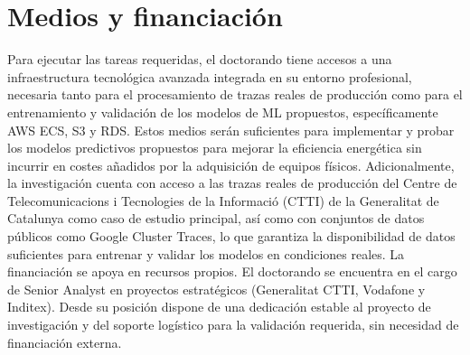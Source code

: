 \section{Medios y financiación}
Para ejecutar las tareas requeridas, el doctorando tiene accesos a una infraestructura tecnológica avanzada integrada en su entorno profesional, necesaria tanto para el procesamiento de trazas reales de producción como para el entrenamiento y validación de los modelos de ML propuestos, específicamente AWS ECS, S3 y RDS. Estos medios serán suficientes para implementar y probar los modelos predictivos propuestos para mejorar la eficiencia energética sin incurrir en costes añadidos por la adquisición de equipos físicos.
Adicionalmente, la investigación cuenta con acceso a las trazas reales de producción del Centre de Telecomunicacions i Tecnologies de la Informació (CTTI) de la Generalitat de Catalunya como caso de estudio principal, así como con conjuntos de datos públicos como Google Cluster Traces, lo que garantiza la disponibilidad de datos suficientes para entrenar y validar los modelos en condiciones reales.
La financiación se apoya en recursos propios.
El doctorando se encuentra en el cargo de Senior Analyst en proyectos estratégicos (Generalitat CTTI, Vodafone y Inditex).
Desde su posición dispone de una dedicación estable al proyecto de investigación y del soporte logístico para la validación requerida, sin necesidad de financiación externa.
